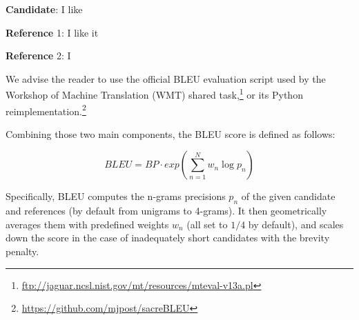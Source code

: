 \bigskip

\textbf{Candidate}: I like

\textbf{Reference} 1: I like it

\textbf{Reference} 2: I

\bigskip

We advise the reader to use the official BLEU evaluation script used by the Workshop of Machine Translation (WMT) shared task,\footnote{\url{ftp://jaguar.ncsl.nist.gov/mt/resources/mteval-v13a.pl}} or its Python reimplementation.\footnote{\url{https://github.com/mjpost/sacreBLEU}}

Combining those two main components, the BLEU score is defined as follows:

\begin{equation}
    BLEU=BP\cdot exp\left( \sum_{n=1}^{N} w_n \log p_n \right)
\end{equation}

Specifically, BLEU computes the n-grams precisions $p_n$ of the given candidate and references (by default from unigrams to 4-grams).
It then geometrically averages them with predefined weights $w_n$ (all set to $1/4$ by default), and scales down the score in the case of inadequately short candidates with the brevity penalty.
